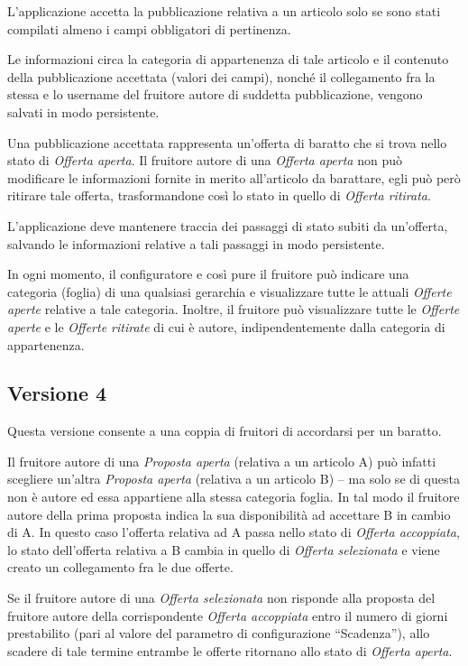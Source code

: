 L’applicazione accetta la pubblicazione relativa a un articolo solo se sono stati compilati almeno i campi obbligatori di pertinenza. 

Le informazioni circa la categoria di appartenenza di tale articolo e il contenuto della pubblicazione accettata (valori dei campi), nonché il collegamento fra la stessa e lo username del fruitore autore di suddetta pubblicazione, vengono salvati in modo persistente. 

Una pubblicazione accettata rappresenta un’offerta di baratto che si trova nello stato di \textit{Offerta aperta}. Il fruitore autore di una \textit{Offerta aperta} non può modificare le informazioni fornite in merito all’articolo da barattare, egli può però ritirare tale offerta, trasformandone così lo stato in quello di \textit{Offerta ritirata}.

L’applicazione deve mantenere traccia dei passaggi di stato subiti da un’offerta, salvando le informazioni relative a tali passaggi in modo persistente. 

In ogni momento, il configuratore e così pure il fruitore può indicare una categoria (foglia) di una qualsiasi gerarchia e visualizzare tutte le attuali \textit{Offerte aperte} relative a tale categoria. Inoltre, il fruitore può visualizzare tutte le \textit{Offerte aperte} e le \textit{Offerte ritirate} di cui è autore, indipendentemente dalla categoria di appartenenza.

\subsection{Versione 4}
Questa versione consente a una coppia di fruitori di accordarsi per un baratto. 

Il fruitore autore di una \textit{Proposta aperta} (relativa a un articolo A) può infatti scegliere un’altra \textit{Proposta aperta} (relativa a un articolo B) – ma solo se di questa non è autore ed essa appartiene alla stessa categoria foglia. 
In tal modo il fruitore autore della prima proposta indica la sua disponibilità ad accettare B in cambio di A. In questo caso l’offerta relativa ad A passa nello stato di \textit{Offerta accoppiata}, lo stato dell’offerta relativa a B cambia in quello di \textit{Offerta selezionata} e viene creato un collegamento fra le due offerte.

Se il fruitore autore di una \textit{Offerta selezionata} non risponde alla proposta del fruitore autore della corrispondente \textit{Offerta accoppiata} entro il numero di giorni prestabilito (pari al valore del parametro di configurazione “Scadenza”), allo scadere di tale termine entrambe le offerte ritornano allo stato di \textit{Offerta aperta}. 

